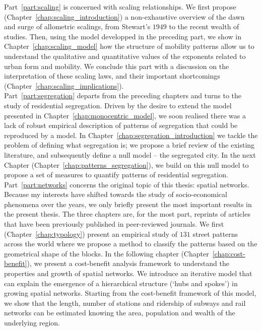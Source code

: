 Part~\ref{part:scaling} is concerned with scaling relationships. We first propose
(Chapter~\ref{chap:scaling_introduction}) a non-exhaustive overview of the dawn
and surge of allometric scalings, from Stewart's $1949$ to the recent wealth of
studies. Then, using the model developped in the preceding part, we show in
Chapter~\ref{chap:scaling_model} how the structure of mobility patterns allow us
to understand the qualitative and quantitative values of the exponents related
to urban form and mobility. We conclude this part with a discussion on the
interpretation of these scaling laws, and their important shortcomings
(Chapter~\ref{chap:scaling_implications}).\\

Part~\ref{part:segregation} departs from the preceding chapters and turns to the
study of residential segregation. Driven by the desire to extend the model
presented in Chapter~\ref{chap:monocentric_model}, we soon realised there was a
lack of robust empirical description of patterns of segregation that could be
reproduced by a model. In Chapter~\ref{chap:segregation_introduction} we tackle
the problem of defining what segregation is; we propose a brief review of the
existing literature, and subsequently define a null model -- the segregated
city. In the next Chapter (Chapter~\ref{chap:patterns_segregation}), we build on
this null model to propose a set of measures to quantify patterns of residential
segregation.\\

Part~\ref{part:networks} concerns the original topic of this thesis: spatial
networks. Because my interests have shifted towards the study of
socio-economical phenomena over the years, we only briefly present the most
important results in the present thesis. The three chapters are, for the most
part, reprints of articles that have been previously published in peer-reviewed
journals. We first (Chapter~\ref{chap:typology}) present an empirical study of
$131$ street patterns across the world where we propose a method to classify the
patterns based on the geometrical shape of the blocks. In the following chapter
(Chapter~\ref{chap:cost-benefit}), we present a cost-benefit analysis framework
to understand the properties and growth of spatial networks.  We introduce an
iterative model that can explain the emergence of a hierarchical structure
(`hubs and spokes') in growing spatial networks. Starting from the cost-benefit
framework of this model, we show that the length, number of stations and
ridership of subways and rail networks can be estimated knowing the area,
population and wealth of the underlying region.\\


